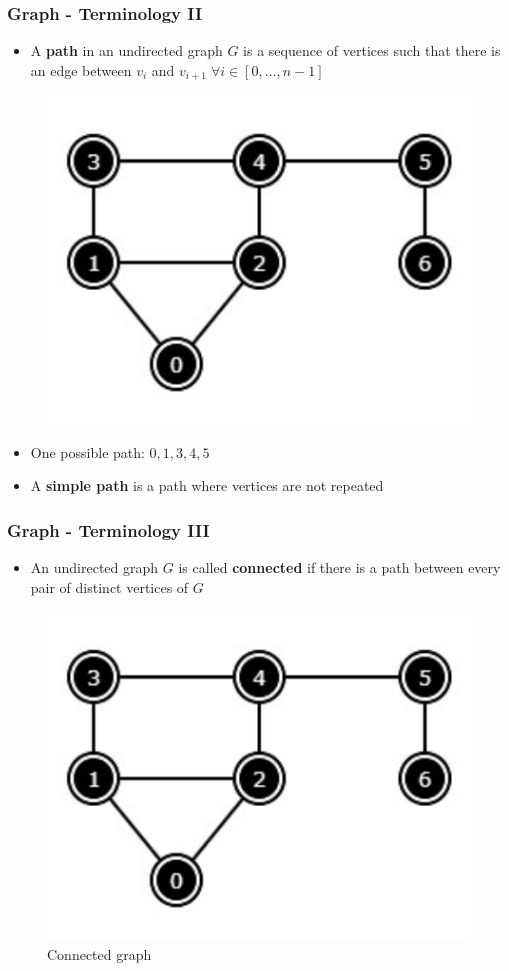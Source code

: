 \documentclass{beamer}
\begin{document}
\begin{frame}[fragile]
\frametitle{Graph - Terminology II}
	\begin{itemize}
		\item A \textbf{path} in an undirected graph $G$ is a sequence of vertices such that there is an edge between $v_i$ and $v_{i+1} \; \forall i \in [0,\ldots,n-1]$
	\end{itemize}
	\begin{figure}
		\centering
		\includegraphics[scale=0.4]{imgs/2.4/graph/graph.png}
	\end{figure}
	\begin{itemize}
		\item One possible path: $0,1,3,4,5$
		\item A \textbf{simple path} is a path where vertices are not repeated
	\end{itemize}
\end{frame}

\begin{frame}[fragile]
\frametitle{Graph - Terminology III}
	\begin{itemize}
		\item An undirected graph $G$ is called \textbf{connected} if there is a path between every pair of distinct vertices of $G$
	\end{itemize}
	\begin{figure}
		\centering
		\includegraphics[scale=0.4]{imgs/2.4/graph/graph.png}
		\caption{Connected graph}
	\end{figure}
\end{frame}
\end{document}
